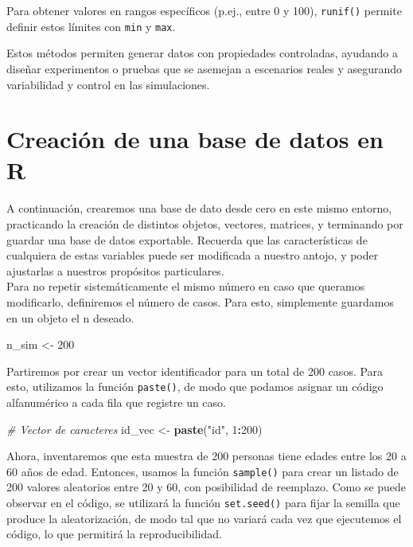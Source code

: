 \documentclass[
]{book}
\newenvironment{Shaded}{\begin{snugshade}}{\end{snugshade}}
\newcommand{\CommentTok}[1]{\textcolor[rgb]{0.56,0.35,0.01}{\textit{#1}}}
\newcommand{\DecValTok}[1]{\textcolor[rgb]{0.00,0.00,0.81}{#1}}
\newcommand{\FunctionTok}[1]{\textcolor[rgb]{0.13,0.29,0.53}{\textbf{#1}}}
\newcommand{\NormalTok}[1]{#1}
\newcommand{\OtherTok}[1]{\textcolor[rgb]{0.56,0.35,0.01}{#1}}
\newcommand{\SpecialCharTok}[1]{\textcolor[rgb]{0.81,0.36,0.00}{\textbf{#1}}}
\newcommand{\StringTok}[1]{\textcolor[rgb]{0.31,0.60,0.02}{#1}}
\begin{document}
Para obtener valores en rangos específicos (p.ej., entre 0 y 100), \texttt{runif()} permite definir estos límites con \texttt{min} y \texttt{max}.

Estos métodos permiten generar datos con propiedades controladas, ayudando a diseñar experimentos o pruebas que se asemejan a escenarios reales y asegurando variabilidad y control en las simulaciones.

\hypertarget{creaciuxf3n-de-una-base-de-datos-en-r}{%
\section{Creación de una base de datos en R}\label{creaciuxf3n-de-una-base-de-datos-en-r}}

A continuación, crearemos una base de dato desde cero en este mismo entorno, practicando la creación de distintos objetos, vectores, matrices, y terminando por guardar una base de datos exportable. Recuerda que las características de cualquiera de estas variables puede ser modificada a nuestro antojo, y poder ajustarlas a nuestros propósitos particulares.\\
Para no repetir sistemáticamente el mismo número en caso que queramos modificarlo, definiremos el número de casos. Para esto, simplemente guardamos en un objeto el n deseado.

\begin{Shaded}
\begin{Highlighting}[]
\NormalTok{n\_sim }\OtherTok{\textless{}{-}} \DecValTok{200}
\end{Highlighting}
\end{Shaded}

Partiremos por crear un vector identificador para un total de 200 casos. Para esto, utilizamos la función \texttt{paste()}, de modo que podamos asignar un código alfanumérico a cada fila que registre un caso.

\begin{Shaded}
\begin{Highlighting}[]
\CommentTok{\# Vector de caracteres}
\NormalTok{id\_vec }\OtherTok{\textless{}{-}} \FunctionTok{paste}\NormalTok{(}\StringTok{"id"}\NormalTok{, }\DecValTok{1}\SpecialCharTok{:}\DecValTok{200}\NormalTok{)}
\end{Highlighting}
\end{Shaded}

Ahora, inventaremos que esta muestra de 200 personas tiene edades entre los 20 a 60 años de edad. Entonces, usamos la función \texttt{sample()} para crear un listado de 200 valores aleatorios entre 20 y 60, con posibilidad de reemplazo. Como se puede observar en el código, se utilizará la función \texttt{set.seed()} para fijar la semilla que produce la aleatorización, de modo tal que no variará cada vez que ejecutemos el código, lo que permitirá la reproducibilidad.
\end{document}
